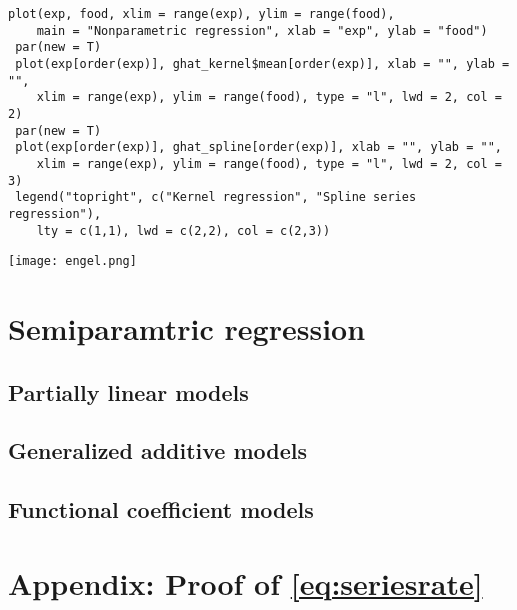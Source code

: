 \documentclass[11pt, A4paper, openany, uplatex]{book}
\begin{document}
\begin{lstlisting}[basicstyle=\ttfamily\footnotesize, frame=single]
 plot(exp, food, xlim = range(exp), ylim = range(food), 
	main = "Nonparametric regression", xlab = "exp", ylab = "food")
 par(new = T)
 plot(exp[order(exp)], ghat_kernel$mean[order(exp)], xlab = "", ylab = "",
	xlim = range(exp), ylim = range(food), type = "l", lwd = 2, col = 2)
 par(new = T)
 plot(exp[order(exp)], ghat_spline[order(exp)], xlab = "", ylab = "",
	xlim = range(exp), ylim = range(food), type = "l", lwd = 2, col = 3)
 legend("topright", c("Kernel regression", "Spline series regression"), 
	lty = c(1,1), lwd = c(2,2), col = c(2,3))
\end{lstlisting}

\begin{center}
	\texttt{[image: engel.png]}
\end{center}

\section{Semiparamtric regression}

\subsection{Partially linear models}

\subsection{Generalized additive models}

\subsection{Functional coefficient models}

\section*{Appendix: Proof of \eqref{eq:seriesrate}}
\end{document}
